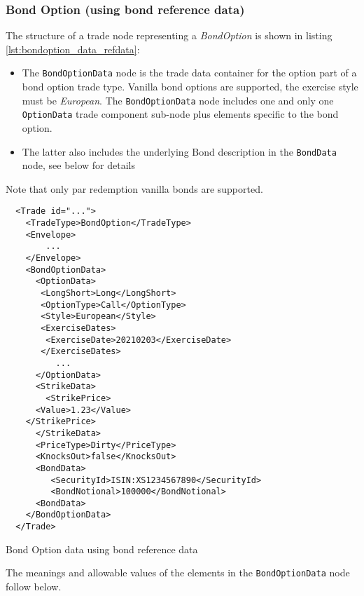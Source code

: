 \subsubsection{Bond Option (using bond reference data)}
\label{ss:bondoption_refdata}

The structure of a trade node representing a \emph{BondOption}  is shown in
listing \ref{lst:bondoption_data_refdata}:
\begin{itemize}
\item The \lstinline!BondOptionData!  node is the trade data container for
the option part of a bond option trade type. Vanilla bond
options are supported, the exercise style must be \emph{European}.
The \lstinline!BondOptionData!  node includes one and
only one \lstinline!OptionData! trade component sub-node plus elements
specific to the bond option.
\item The latter also includes the underlying Bond description in the \lstinline!BondData!
  node, see below for details
\end{itemize}

Note that only par redemption vanilla bonds are supported.

\begin{listing}[H]
\begin{verbatim}
  <Trade id="...">
    <TradeType>BondOption</TradeType>
    <Envelope>
        ...
    </Envelope>
    <BondOptionData>
      <OptionData>
       <LongShort>Long</LongShort>
       <OptionType>Call</OptionType>
       <Style>European</Style>
       <ExerciseDates>
        <ExerciseDate>20210203</ExerciseDate>
       </ExerciseDates>
          ...
      </OptionData>
      <StrikeData>
        <StrikePrice>
	  <Value>1.23</Value>
	</StrikePrice>
      </StrikeData>
      <PriceType>Dirty</PriceType>
      <KnocksOut>false</KnocksOut>
      <BondData>
         <SecurityId>ISIN:XS1234567890</SecurityId>
         <BondNotional>100000</BondNotional>
      <BondData>
    </BondOptionData>
  </Trade>
\end{verbatim}
\caption{Bond Option data using bond reference data}
\label{lst:bondoption_data_refdata}
\end{listing}

The meanings and allowable values of the elements in the \lstinline!BondOptionData!  node follow below.

